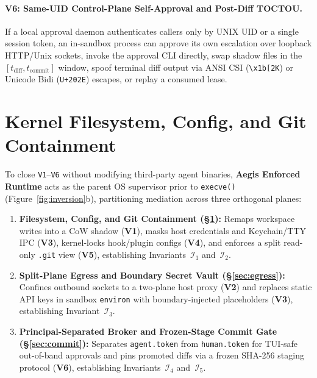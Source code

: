 \documentclass[10pt,twocolumn]{article}
\begin{document}
\paragraph{V6: Same-UID Control-Plane Self-Approval and Post-Diff TOCTOU.}
If a local approval daemon authenticates callers only by UNIX UID or a single session token, an in-sandbox process can approve its own escalation over loopback HTTP/Unix sockets, invoke the approval CLI directly, swap shadow files in the $[t_{\text{diff}}, t_{\text{commit}}]$ window, spoof terminal diff output via ANSI CSI (\texttt{\textbackslash x1b[2K}) or Unicode Bidi (\texttt{U+202E}) escapes, or replay a consumed lease.

\section{Kernel Filesystem, Config, and Git Containment}
\label{sec:launcher}

To close \texttt{V1}--\texttt{V6} without modifying third-party agent binaries, \textbf{Aegis Enforced Runtime} acts as the parent OS supervisor prior to \texttt{execve()} (Figure~\ref{fig:inversion}b), partitioning mediation across three orthogonal planes:
\begin{enumerate}
    \item \textbf{Filesystem, Config, and Git Containment (\S\ref{sec:launcher}):} Remaps workspace writes into a CoW shadow (\textbf{V1}), masks host credentials and Keychain/TTY IPC (\textbf{V3}), kernel-locks hook/plugin configs (\textbf{V4}), and enforces a split read-only \texttt{.git} view (\textbf{V5}), establishing Invariants~$\mathcal{I}_1$ and~$\mathcal{I}_2$.
    \item \textbf{Split-Plane Egress and Boundary Secret Vault (\S\ref{sec:egress}):} Confines outbound sockets to a two-plane host proxy (\textbf{V2}) and replaces static API keys in sandbox \texttt{environ} with boundary-injected placeholders (\textbf{V3}), establishing Invariant~$\mathcal{I}_3$.
    \item \textbf{Principal-Separated Broker and Frozen-Stage Commit Gate (\S\ref{sec:commit}):} Separates \texttt{agent.token} from \texttt{human.token} for TUI-safe out-of-band approvals and pins promoted diffs via a frozen SHA-256 staging protocol (\textbf{V6}), establishing Invariants~$\mathcal{I}_4$ and~$\mathcal{I}_5$.
\end{enumerate}
\end{document}
